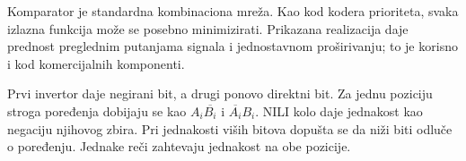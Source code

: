 Komparator je standardna kombinaciona mreža. Kao kod kodera prioriteta, svaka izlazna funkcija može se posebno minimizirati. Prikazana realizacija daje prednost preglednim putanjama signala i jednostavnom proširivanju; to je korisno i kod komercijalnih komponenti.

Prvi invertor daje negirani bit, a drugi ponovo direktni bit. Za jednu poziciju stroga poređenja dobijaju se kao $A_i\overline{B_i}$ i $\overline{A_i}B_i$. NILI kolo daje jednakost kao negaciju njihovog zbira. Pri jednakosti viših bitova dopušta se da niži biti odluče o poređenju. Jednake reči zahtevaju jednakost na obe pozicije.

